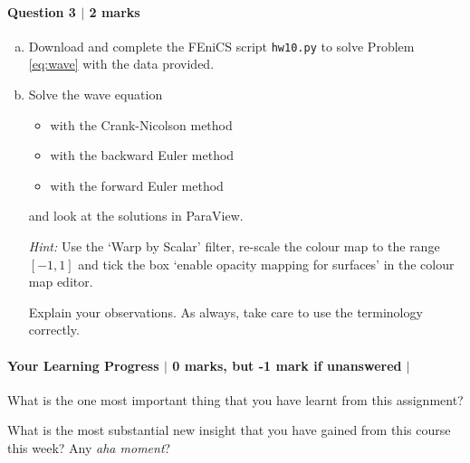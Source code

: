 \documentclass[10pt,letterpaper]{scrartcl}
\begin{document}
\newpage

\paragraph*{Question 3 $\vert$ 2 marks}

\begin{enumerate}[(a)]
\item \faFileCodeO \: Download and complete the \textsf{FEniCS} script \texttt{hw10.py} to solve Problem \eqref{eq:wave} with the data provided.
\item \faFilePdfO \:  Solve the wave equation
\begin{itemize}
\item with the Crank-Nicolson method
\item with the backward Euler method
\item with the forward Euler method
\end{itemize}
and look at the solutions in \textsf{ParaView}.

\emph{Hint:} Use the `Warp by Scalar' filter, re-scale the colour map to the range $[-1,1]$ and tick the box `enable opacity mapping for surfaces' in the colour map editor.

Explain your observations. As always, take care to use the terminology correctly.

\vfill 
\end{enumerate}

\paragraph*{Your Learning Progress $\vert$ 0 marks, but -1 mark if unanswered $\vert$ \faFilePdfO}
What is the one most important thing that you have learnt from this assignment?

\vspace*{3mm}
\hrulefill

\vspace*{3mm}
\hrulefill

\vspace*{3mm}
\hrulefill

What is the most substantial new insight that you have gained from this course this week? Any \emph{aha moment}?

\vspace*{3mm}
\hrulefill

\vspace*{3mm}
\hrulefill

\vspace*{3mm}
\hrulefill
\end{document}
